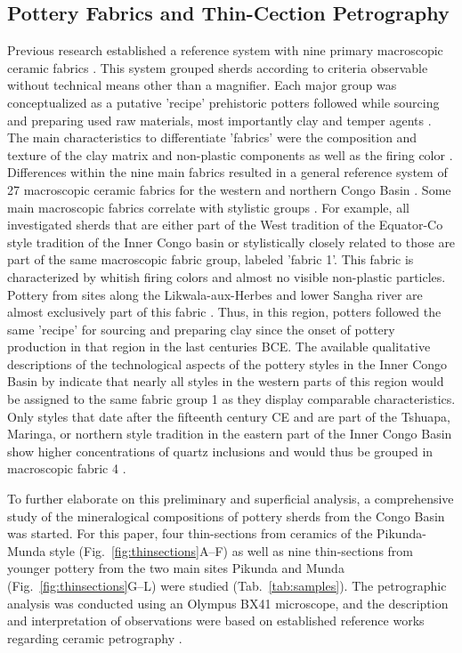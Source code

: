 \documentclass[smallextended,natbib]{svjour3}       %
\begin{document}
\subsection{Pottery Fabrics and Thin-Cection Petrography}

Previous research established a reference system with nine primary macroscopic ceramic fabrics \cite[60--69]{Seidensticker.2021e}. This system grouped sherds according to criteria observable without technical means other than a magnifier. Each major group was conceptualized as a putative 'recipe' prehistoric potters followed while sourcing and preparing used raw materials, most importantly clay and temper agents \citep[49]{Lange.2006}. The main characteristics to differentiate 'fabrics' \citep[cf.][38--51]{Riemer.2011} were the composition and texture of the clay matrix and non-plastic components as well as the firing color \citep[34]{Nordstrom.1972}. Differences within the nine main fabrics resulted in a general reference system of 27 macroscopic ceramic fabrics for the western and northern Congo Basin \citep[62--65 Tab.~11]{Seidensticker.2021e}. Some main macroscopic fabrics correlate with stylistic groups \cite[69 Tab.~12]{Seidensticker.2021e}. For example, all investigated sherds that are either part of the West tradition of the Equator-Co style tradition of the Inner Congo basin \citep[221--222 Fig.~4]{Wotzka.1995} or stylistically closely related to those are part of the same macroscopic fabric group, labeled 'fabric 1'. This fabric is characterized by whitish firing colors and almost no visible non-plastic particles. Pottery from sites along the Likwala-aux-Herbes and lower Sangha river are almost exclusively part of this fabric \cite[67 Fig.~21]{Seidensticker.2021e}. Thus, in this region, potters followed the same 'recipe' for sourcing and preparing clay since the onset of pottery production in that region in the last centuries BCE. The available qualitative descriptions of the technological aspects of the pottery styles in the Inner Congo Basin by \citet[59--210]{Wotzka.1995} indicate that nearly all styles in the western parts of this region would be assigned to the same fabric group 1 as they display comparable characteristics. Only styles that date after the fifteenth century CE and are part of the Tshuapa, Maringa, or northern style tradition in the eastern part of the Inner Congo Basin show higher concentrations of quartz inclusions and would thus be grouped in macroscopic fabric 4 \citep[62--65 Tab.~11]{Seidensticker.2021e}.

To further elaborate on this preliminary and superficial analysis, a comprehensive study of the mineralogical compositions of pottery sherds from the Congo Basin was started. For this paper, four thin-sections from ceramics of the Pikunda-Munda style (Fig.~\ref{fig:thinsections}A--F) as well as nine thin-sections from younger pottery from the two main sites Pikunda and Munda (Fig.~\ref{fig:thinsections}G--L) were studied (Tab.~\ref{tab:samples}). The petrographic analysis was conducted using an Olympus BX41 microscope, and the description and interpretation of observations were based on established reference works regarding ceramic petrography \citep{MacKenzie.2017,Quinn.2022}. 
\end{document}
